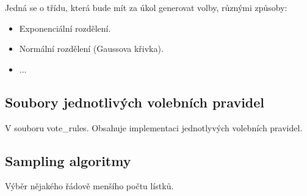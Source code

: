 \documentclass[a4paper,12pt]{report}
\begin{document}
	Jedná se o třídu, která bude mít za úkol generovat volby, různými způsoby:
	
	\begin{itemize}
		\item Exponenciální rozdělení.
		\item Normální rozdělení (Gaussova křivka).
		\item ...
	\end{itemize}
	
	\subsection{Soubory jednotlivých volebních pravidel}
	
	V souboru vote\_rules. Obsahuje implementaci jednotlyvých volebních pravidel.
	
	\subsection{Sampling algoritmy}
	
	Výběr nějakého řádově menšího počtu lístků.
	
	
	
	
	
	
	
	
	
	
	
	
\end{document}
